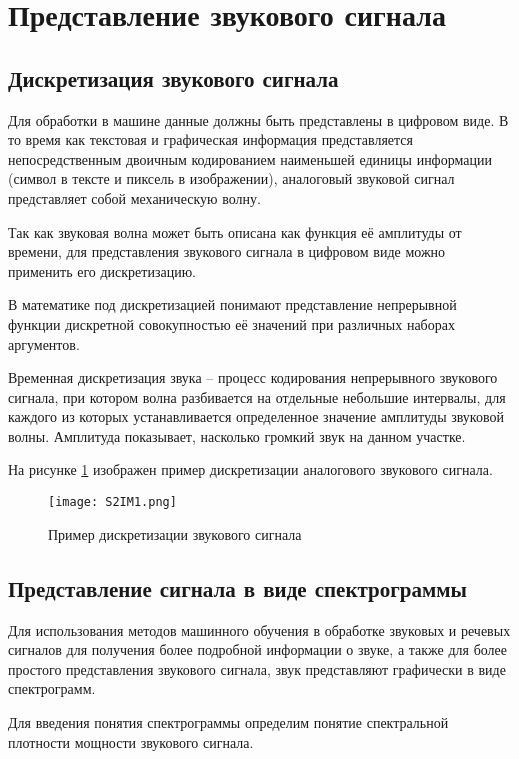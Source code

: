 \section{Представление звукового сигнала}

\subsection{Дискретизация звукового сигнала}

Для обработки в машине данные должны быть представлены в цифровом виде.
В то время как текстовая и графическая информация представляется
непосредственным двоичным кодированием наименьшей единицы информации
(символ в тексте и пиксель в изображении), аналоговый звуковой сигнал
представляет собой механическую волну.

Так как звуковая волна может быть описана как функция её амплитуды от времени,
для представления звукового сигнала в цифровом виде можно применить
его дискретизацию.

В математике под дискретизацией понимают представление непрерывной функции
дискретной совокупностью её значений при различных наборах аргументов.

Временная дискретизация звука -- процесс кодирования непрерывного звукового сигнала,
при котором волна разбивается на отдельные небольшие интервалы, для каждого из которых
устанавливается определенное значение амплитуды звуковой волны. 
Амплитуда показывает, насколько громкий звук на данном участке.

На рисунке \ref{fig:section2:discrete} изображен пример
дискретизации аналогового звукового сигнала.

\begin{figure}[h!]
    \centering
    \texttt{[image: S2IM1.png]}
    \caption{Пример дискретизации звукового сигнала}
    \label{fig:section2:discrete}
\end{figure}

\subsection{Представление сигнала в виде спектрограммы}

Для использования методов машинного обучения в обработке звуковых и речевых сигналов
для получения более подробной информации о звуке, а также для более простого представления
звукового сигнала, звук представляют графически в виде спектрограмм.

Для введения понятия спектрограммы определим понятие спектральной плотности мощности звукового сигнала.

